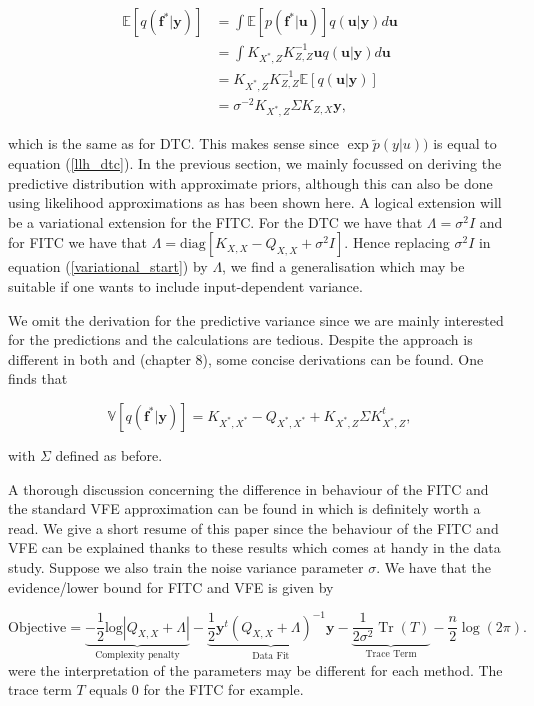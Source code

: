 \documentclass[12pt,a4paper,oneside]{book}
\DeclareMathOperator{\Tr}{Tr}
\begin{document}
\begin{align} \label{mean_predicitive_dtc}
\mathbb{E} [q(\bm{f}^{\ast}|\bm{y})] &= \int \mathbb{E} [p(\bm{f}^{\ast}|\bm{u})] q(\bm{u}|\bm{y}) d\bm{u}  \nonumber \\
&= \int K_{X^{\ast},Z} K_{Z,Z}^{-1} \bm{u} q(\bm{u}|\bm{y}) d\bm{u} \nonumber \\
&= K_{X^{\ast},Z} K_{Z,Z}^{-1} \mathbb{E} [q(\bm{u}|\bm{y})] \nonumber \\ &= \sigma^{-2} K_{X^{\ast},Z} \Sigma K_{Z,X} \bm{y},
\end{align}

which is the same as for DTC. This makes sense since $\exp{ \tilde{p}(y|u))}$ is equal to equation (\ref{llh_dtc}). In the previous section, we mainly focussed on deriving the predictive distribution with approximate priors, although this can also be done using likelihood approximations as has been shown here. A logical extension will be a variational extension for the FITC. For the DTC we have that $\Lambda = \sigma^2 I$ and for FITC we have that $\Lambda = \text{diag}[K_{X,X}-Q_{X,X} + \sigma^2 I]$. Hence replacing $\sigma^2 I$ in equation (\ref{variational_start}) by $\Lambda$, we find a generalisation which may be suitable if one wants to include input-dependent variance.


We omit the derivation for the predictive variance since we are mainly interested for the predictions and the calculations are tedious. Despite the approach is different in both \cite{titsias2009variational} and \cite{GPRbook} (chapter $8$), some concise derivations can be found. One finds that 

\begin{equation}
\mathbb{V} [q(\bm{f}^{\ast}|\bm{y})] =  K_{X^{\ast},X^{\ast}} - Q_{X^{\ast},X^{\ast}} + K_{X^{\ast},Z} \Sigma K_{X^{\ast},Z}^t,
\end{equation}

with $\Sigma$ defined as before. 

A thorough discussion concerning the difference in behaviour of the FITC and the standard VFE approximation can be found in \cite{bauer2016understanding} which is definitely worth a read. We give a short resume of this paper since the behaviour of the FITC and VFE can be explained thanks to these results which comes at handy in the data study. Suppose we also train the noise variance parameter $\sigma$. We have that the evidence/lower bound for FITC and VFE is given by

\begin{equation}\label{log_marg_ind_input}
\text{Objective} = \underbrace{-\dfrac{1}{2} \text{log}|Q_{X,X}+\Lambda|}_{\text{Complexity penalty}} - \underbrace{\dfrac{1}{2} \bm{y}^t (Q_{X,X} + \Lambda)^{-1} \bm{y}}_{\text{Data Fit}} - \underbrace{\dfrac{1}{2 \sigma^2} \Tr (T)}_{\text{Trace Term}} - \dfrac{n}{2} \log{(2\pi)} .
\end{equation}
were the interpretation of the parameters may be different for each method. The trace term $T$ equals $0$ for the FITC for example.
\end{document}
